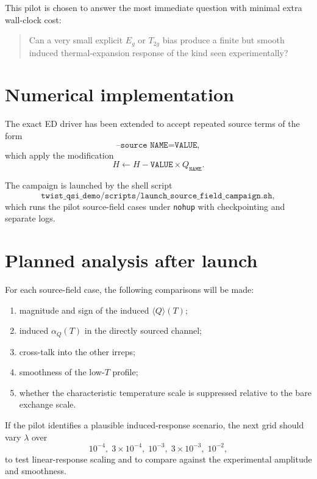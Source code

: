\documentclass[11pt]{article}
\begin{document}
This pilot is chosen to answer the most immediate question with minimal extra
wall-clock cost:
\begin{quote}
Can a very small explicit $E_g$ or $T_{2g}$ bias produce a finite but smooth
induced thermal-expansion response of the kind seen experimentally?
\end{quote}

\section{Numerical implementation}

The exact ED driver has been extended to accept repeated source terms of the
form
\begin{equation}
\texttt{--source NAME=VALUE},
\end{equation}
which apply the modification
\begin{equation}
H \leftarrow H - \texttt{VALUE}\times Q_{\texttt{NAME}}.
\end{equation}

The campaign is launched by the shell script
\begin{equation}
\texttt{twist\_qsi\_demo/scripts/launch\_source\_field\_campaign.sh},
\end{equation}
which runs the pilot source-field cases under \texttt{nohup} with
checkpointing and separate logs.

\section{Planned analysis after launch}

For each source-field case, the following comparisons will be made:
\begin{enumerate}[leftmargin=1.8em]
\item magnitude and sign of the induced $\langle Q\rangle(T)$;
\item induced $\alpha_Q(T)$ in the directly sourced channel;
\item cross-talk into the other irreps;
\item smoothness of the low-$T$ profile;
\item whether the characteristic temperature scale is suppressed relative to
the bare exchange scale.
\end{enumerate}

If the pilot identifies a plausible induced-response scenario, the next grid
should vary $\lambda$ over
\begin{equation}
10^{-4},\; 3\times 10^{-4},\; 10^{-3},\; 3\times 10^{-3},\; 10^{-2},
\end{equation}
to test linear-response scaling and to compare against the experimental
amplitude and smoothness.
\end{document}
